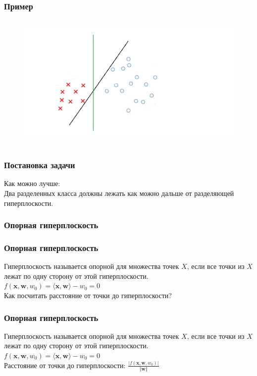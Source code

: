 \documentclass[12pt]{beamer}
\begin{document}
\begin{frame}\frametitle{Пример}
\begin{figure}[htbp]
  \includegraphics[height=190pt, keepaspectratio = true]{images/example}   
\end{figure}
\end{frame}

\begin{frame}\frametitle{Постановка задачи}
Как можно лучше:\\
Два разделенных класса должны лежать как можно дальше от разделяющей гиперплоскости.\\
\end{frame}

\begin{frame}\frametitle{Опорная гиперплоскость}
\end{frame}

\begin{frame}\frametitle{Опорная гиперплоскость}
Гиперплоскость называется опорной для множества точек
$X$, если все точки из $X$ лежат по одну сторону от этой гиперплоскости.\\\vspace{5mm}
${f(\mathbf{x},\mathbf{w}, w_0) = \langle \mathbf{x}, \mathbf{w}\rangle - w_0 = 0}$\\
\vspace{5mm}
Как посчитать расстояние от точки до гиперплоскости?
\end{frame}

\begin{frame}\frametitle{Опорная гиперплоскость}
Гиперплоскость называется опорной для множества точек
$X$, если все точки из $X$ лежат по одну сторону от этой гиперплоскости.\\\vspace{5mm}
${f(\mathbf{x},\mathbf{w}, w_0) = \langle \mathbf{x}, \mathbf{w}\rangle - w_0 = 0}$\\
\vspace{5mm}
Расстояние от точки до гиперплоскости:
$\frac{\vert f(\mathbf{x},\mathbf{w}, w_0) \vert}{\Vert \mathbf{w} \Vert}$
\end{frame}
\end{document}
